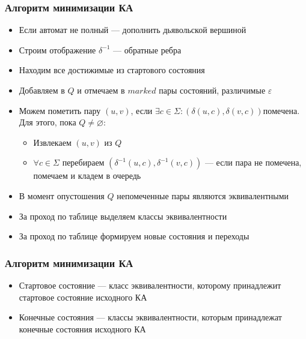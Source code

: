 \documentclass{beamer}
\begin{document}
\begin{frame}[fragile]
  \transwipe[direction=90]
  \frametitle{Алгоритм минимизации КА}   
    \begin{itemize}
      \item Если автомат не полный --- дополнить дьявольской вершиной
      \item Строим отображение $\delta^{-1}$ --- обратные ребра
      \item Находим все достижимые из стартового состояния
      \item Добавляем в $Q$ и отмечаем в $marked$ пары состояний, различимые $\varepsilon$
      \item Можем пометить пару $(u, v)$, если $\exists c \in \Sigma :  (\delta(u, c), \delta(v, c)) помечена$. Для этого, пока $Q \neq \varnothing$:
      \begin{itemize}
        \item Извлекаем $(u, v)$ из $Q$
        \item $\forall c \in \Sigma$ перебираем $(\delta^{-1}(u, c), \delta^{-1}(v, c))$ --- если пара не помечена, помечаем и кладем в очередь
      \end{itemize}
      \item В момент опустошения $Q$ непомеченные пары являются эквивалентными
      \item За проход по таблице выделяем классы эквивалентности
      \item За проход по таблице формируем новые состояния и переходы	
    \end{itemize}
    
\end{frame}

\begin{frame}[fragile]
  \transwipe[direction=90]
  \frametitle{Алгоритм минимизации КА}   
    \begin{itemize}
      \item Стартовое состояние --- класс эквивалентности, которому принадлежит стартовое состояние исходного КА
      \item Конечные состояния --- классы эквивалентности, которым принадлежат конечные состояния исходного КА
    \end{itemize}
    
\end{frame}
\end{document}
